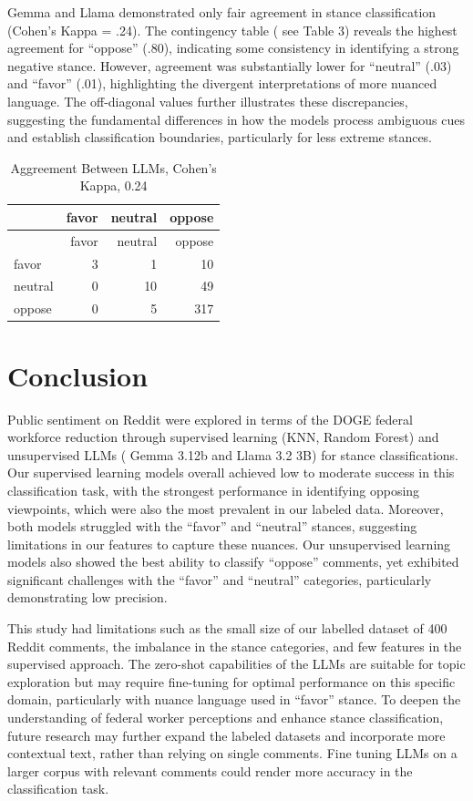 \documentclass[
  12pt]{article}
\begin{document}
Gemma and Llama demonstrated only fair agreement in stance
classification (Cohen's Kappa = .24). The contingency table ( see Table
3) reveals the highest agreement for ``oppose'' (.80), indicating some
consistency in identifying a strong negative stance. However, agreement
was substantially lower for ``neutral'' (.03) and ``favor'' (.01),
highlighting the divergent interpretations of more nuanced language. The
off-diagonal values further illustrates these discrepancies, suggesting
the fundamental differences in how the models process ambiguous cues and
establish classification boundaries, particularly for less extreme
stances.

\begin{longtable}[]{@{}lrrr@{}}
\caption{Aggreement Between LLMs, Cohen's Kappa, 0.24}\tabularnewline
\toprule\noalign{}
& favor & neutral & oppose \\
\midrule\noalign{}
\endfirsthead
\toprule\noalign{}
& favor & neutral & oppose \\
\midrule\noalign{}
\endhead
\bottomrule\noalign{}
\endlastfoot
favor & 3 & 1 & 10 \\
neutral & 0 & 10 & 49 \\
oppose & 0 & 5 & 317 \\
\end{longtable}

\section{Conclusion}\label{conclusion}

Public sentiment on Reddit were explored in terms of the DOGE federal
workforce reduction through supervised learning (KNN, Random Forest) and
unsupervised LLMs ( Gemma 3.12b and Llama 3.2 3B) for stance
classifications. Our supervised learning models overall achieved low to
moderate success in this classification task, with the strongest
performance in identifying opposing viewpoints, which were also the most
prevalent in our labeled data. Moreover, both models struggled with the
``favor'' and ``neutral'' stances, suggesting limitations in our
features to capture these nuances. Our unsupervised learning models also
showed the best ability to classify ``oppose'' comments, yet exhibited
significant challenges with the ``favor'' and ``neutral'' categories,
particularly demonstrating low precision.

This study had limitations such as the small size of our labelled
dataset of 400 Reddit comments, the imbalance in the stance categories,
and few features in the supervised approach. The zero-shot capabilities
of the LLMs are suitable for topic exploration but may require
fine-tuning for optimal performance on this specific domain,
particularly with nuance language used in ``favor'' stance. To deepen
the understanding of federal worker perceptions and enhance stance
classification, future research may further expand the labeled datasets
and incorporate more contextual text, rather than relying on single
comments. Fine tuning LLMs on a larger corpus with relevant comments
could render more accuracy in the classification task.
\end{document}
